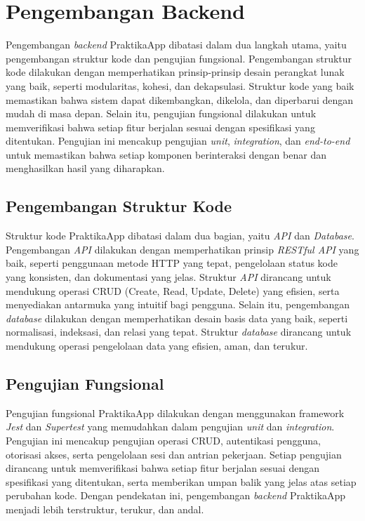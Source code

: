 \section{Pengembangan Backend}
Pengembangan \emph{backend} PraktikaApp dibatasi dalam dua langkah utama, yaitu pengembangan struktur kode dan pengujian fungsional. Pengembangan struktur kode dilakukan dengan memperhatikan prinsip-prinsip desain perangkat lunak yang baik, seperti modularitas, kohesi, dan dekapsulasi. Struktur kode yang baik memastikan bahwa sistem dapat dikembangkan, dikelola, dan diperbarui dengan mudah di masa depan. Selain itu, pengujian fungsional dilakukan untuk memverifikasi bahwa setiap fitur berjalan sesuai dengan spesifikasi yang ditentukan. Pengujian ini mencakup pengujian \emph{unit}, \emph{integration}, dan \emph{end-to-end} untuk memastikan bahwa setiap komponen berinteraksi dengan benar dan menghasilkan hasil yang diharapkan.

\subsection{Pengembangan Struktur Kode}
Struktur kode PraktikaApp dibatasi dalam dua bagian, yaitu \emph{API} dan \emph{Database}. Pengembangan \emph{API} dilakukan dengan memperhatikan prinsip \emph{RESTful API} yang baik, seperti penggunaan metode HTTP yang tepat, pengelolaan status kode yang konsisten, dan dokumentasi yang jelas. Struktur \emph{API} dirancang untuk mendukung operasi CRUD (Create, Read, Update, Delete) yang efisien, serta menyediakan antarmuka yang intuitif bagi pengguna. Selain itu, pengembangan \emph{database} dilakukan dengan memperhatikan desain basis data yang baik, seperti normalisasi, indeksasi, dan relasi yang tepat. Struktur \emph{database} dirancang untuk mendukung operasi pengelolaan data yang efisien, aman, dan terukur.

\subsection{Pengujian Fungsional}
Pengujian fungsional PraktikaApp dilakukan dengan menggunakan framework \emph{Jest} dan \emph{Supertest} yang memudahkan dalam pengujian \emph{unit} dan \emph{integration}. Pengujian ini mencakup pengujian operasi CRUD, autentikasi pengguna, otorisasi akses, serta pengelolaan sesi dan antrian pekerjaan. Setiap pengujian dirancang untuk memverifikasi bahwa setiap fitur berjalan sesuai dengan spesifikasi yang ditentukan, serta memberikan umpan balik yang jelas atas setiap perubahan kode. Dengan pendekatan ini, pengembangan \emph{backend} PraktikaApp menjadi lebih terstruktur, terukur, dan andal.

